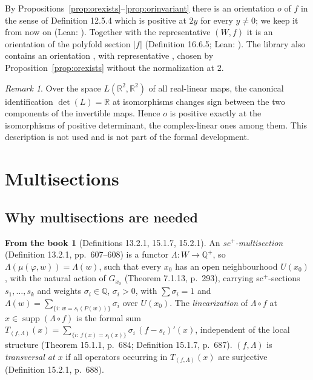 \documentclass[11pt,a4paper]{article}
\theoremstyle{plain}
\theoremstyle{definition}
\newtheorem{recall}[theorem]{From the book}
\theoremstyle{remark}
\newtheorem{remark}[theorem]{Remark}
\newcommand{\R}{\mathbb{R}}
\newcommand{\Q}{\mathbb{Q}}
\newcommand{\abs}[1]{\lvert #1\rvert}
\newcommand{\supp}{\operatorname{supp}}
\begin{document}
By Propositions~\ref{prop:orexists}--\ref{prop:orinvariant} there is an orientation $o$ of $f$ in the
sense of Definition 12.5.4 which is positive at $2y$ for every $y\neq0$; we keep it from now on (Lean:
). Together with the representative $(W,f)$ it is an orientation of the
polyfold section $\abs f$ (Definition 16.6.5; Lean: ). The library also
contains an orientation , with representative , chosen by
Proposition~\ref{prop:orexists} without the normalization at $2$.

\begin{remark}
Over the space $L(\R^2,\R^2)$ of all real-linear maps, the canonical identification $\det(L)=\R$ at
isomorphisms changes sign between the two components of the invertible maps. Hence $o$ is positive
exactly at the isomorphisms of positive determinant, the complex-linear ones among them. This
description is not used and is not part of the formal development.
\end{remark}

\section{Multisections}\label{sec:multi}

\subsection{Why multisections are needed}

\begin{recall}[Definitions 13.2.1, 15.1.7, 15.2.1]\label{rec:multisection}
An \emph{sc$^+$-multisection} (Definition 13.2.1, pp.~607--608) is a functor $\Lambda\colon W\to\Q^+$,
so $\Lambda(\mu(\varphi,w))=\Lambda(w)$, such that every $x_0$ has an open neighbourhood $U(x_0)$, with
the natural action of $G_{x_0}$ (Theorem 7.1.13, p.~293), carrying sc$^+$-sections $s_1,\dots,s_k$ and
weights $\sigma_i\in\Q$, $\sigma_i>0$, with $\sum\sigma_i=1$ and
$\Lambda(w)=\sum_{\{i:\,w=s_i(P(w))\}}\sigma_i$ over $U(x_0)$. The \emph{linearization} of
$\Lambda\circ f$ at $x\in\supp(\Lambda\circ f)$ is the formal sum
$T_{(f,\Lambda)}(x)=\sum_{\{i:\,f(x)=s_i(x)\}}\sigma_i\,(f-s_i)'(x)$, independent of the local
structure (Theorem 15.1.1, p.~684; Definition 15.1.7, p.~687). $(f,\Lambda)$ is \emph{transversal at
$x$} if all operators occurring in $T_{(f,\Lambda)}(x)$ are surjective (Definition 15.2.1, p.~688).
\end{recall}
\end{document}
